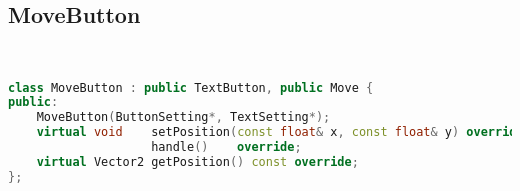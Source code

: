 \subsection{MoveButton}
\begin{lstlisting}[language=C++]


class MoveButton : public TextButton, public Move {
public:
    MoveButton(ButtonSetting*, TextSetting*);
    virtual void    setPosition(const float& x, const float& y) override,
                    handle()    override;
    virtual Vector2 getPosition() const override;
};






\end{lstlisting}
